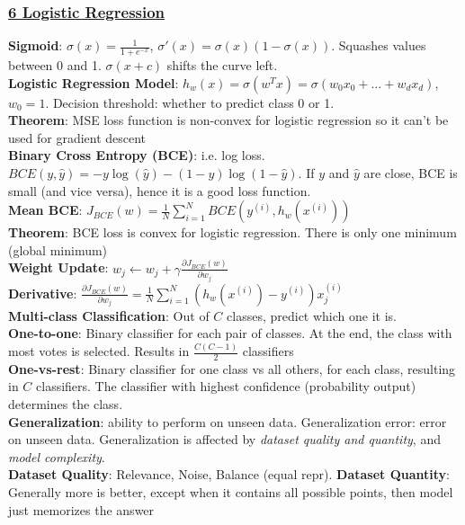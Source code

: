\documentclass{article}
\begin{document}
{\begin{multicols*}{3}
\subsubsection*{\underline{6 Logistic Regression}}
\textbf{Sigmoid}: $\sigma(x)=\frac{1}{1+e^{-x}}$, $\sigma'(x)=\sigma(x)(1-\sigma(x))$. Squashes values between 0 and 1. $\sigma(x+c)$ shifts the curve left. \\
\textbf{Logistic Regression Model}: $h_w(x)=\sigma(w^Tx)=\sigma(w_0x_0+\dots+w_dx_d)$, $w_0=1$. Decision threshold: whether to predict class 0 or 1. \\
\textbf{Theorem}: MSE loss function is non-convex for logistic regression so it can't be used for gradient descent\\
\textbf{Binary Cross Entropy (BCE)}: i.e. log loss. $BCE(y,\hat{y})=-y\log(\hat{y})-(1-y)\log(1-\hat{y})$. If $y$ and $\hat{y}$ are close, BCE is small (and vice versa), hence it is a good loss function.\\
\textbf{Mean BCE}: $J_{BCE}(w)=\frac{1}{N}\sum_{i=1}^NBCE(y^{(i)},h_w(x^{(i)}))$\\
\textbf{Theorem}: BCE loss is convex for logistic regression. There is only one minimum (global minimum) \\
\textbf{Weight Update}: $w_j\leftarrow w_j+\gamma\frac{\partial J_{BCE}(w)}{\partial w_j}$\\
\textbf{Derivative}: $\frac{\partial J_{BCE}(w)}{\partial w_j}=\frac{1}{N}\sum_{i=1}^N(h_w(x^{(i)})-y^{(i)})x_j^{(i)}$\\
\textbf{Multi-class Classification}: Out of $C$ classes, predict which one it is. \\
\textbf{One-to-one}: Binary classifier for each pair of classes. At the end, the class with most votes is selected. Results in $\frac{C(C-1)}{2}$ classifiers\\
\textbf{One-vs-rest}: Binary classifier for one class vs all others, for each class, resulting in $C$ classifiers. The classifier with highest confidence (probability output) determines the class.\\
\textbf{Generalization}: ability to perform on unseen data. Generalization error: error on unseen data. Generalization is affected by \textit{dataset quality and quantity}, and \textit{model complexity}. \\
\textbf{Dataset Quality}: Relevance, Noise, Balance (equal repr). \textbf{Dataset Quantity}: Generally more is better, except when it contains all possible points, then model just memorizes the answer\\

\end{multicols*}}
\end{document}
